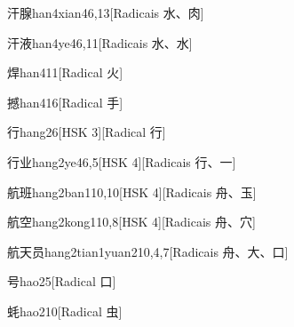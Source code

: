 \begin{entry}{汗腺}{han4xian4}{6,13}[Radicais ⽔、⾁]
\end{entry}

\begin{entry}{汗液}{han4ye4}{6,11}[Radicais ⽔、⽔]
\end{entry}

\begin{entry}{焊}{han4}{11}[Radical ⽕]
\end{entry}

\begin{entry}{撼}{han4}{16}[Radical ⼿]
\end{entry}

\begin{entry}{行}{hang2}{6}[HSK 3][Radical ⾏]
\end{entry}

\begin{entry}{行业}{hang2ye4}{6,5}[HSK 4][Radicais ⾏、⼀]
\end{entry}

\begin{entry}{航班}{hang2ban1}{10,10}[HSK 4][Radicais ⾈、⽟]
\end{entry}

\begin{entry}{航空}{hang2kong1}{10,8}[HSK 4][Radicais ⾈、⽳]
\end{entry}

\begin{entry}{航天员}{hang2tian1yuan2}{10,4,7}[Radicais ⾈、⼤、⼝]
\end{entry}

\begin{entry}{号}{hao2}{5}[Radical ⼝]
\end{entry}

\begin{entry}{蚝}{hao2}{10}[Radical ⾍]
\end{entry}

